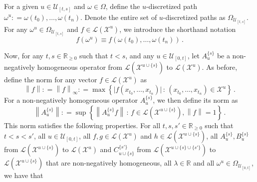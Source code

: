 \documentclass[a4paper,reqno]{amsart}
\newcommand{\reals}{\mathbb{R}}
\newcommand{\realsnonneg}{\reals_{\geq 0}}
\newcommand{\states}{\mathcal{X}}
\newcommand{\gambles}{\mathcal{L}}
\newcommand{\norm}[1]{\left\lVert #1 \right\rVert}
\newcommand{\coloneqq}{:\!=}
\begin{document}
For a given $u\in\mathcal{U}_{[t,s]}$ and $\omega\in\Omega$, define the $u$-discretized path $\omega^u\coloneqq \omega(t_0),\ldots,\omega(t_n)$. Denote the entire set of $u$-discretized paths as $\Omega_{\mathcal{U}_{[t,s]}}$. For any $\omega^u\in\Omega_{\mathcal{U}_{[t,s]}}$ and $f\in\gambles(\states^u)$, we introduce the shorthand notation
\begin{equation*}
f(\omega^u) \equiv f(\omega(t_0),\ldots,\omega(t_n))\,.
\end{equation*}

Now, for any $t,s\in\realsnonneg$ such that $t<s$, and any $u\in\mathcal{U}_{[0,t]}$, let $A_u^{\{s\}}$ be a non-negatively homogeneous operator from $\gambles(\states^{u\cup \{s\}})$ to $\gambles(\states^u)$.
As before, define the norm for any vector $f\in\gambles(\states^u)$ as
\begin{equation*}
\norm{f}\coloneqq\norm{f}_\infty\coloneqq\max\left\{\bigl\vert f(x_{t_0},\ldots,x_{t_n})\bigr\vert\,:\,(x_{t_0},\ldots,x_{t_n})\in\states^u\right\}\,.
\end{equation*}
For a non-negatively homogeneous operator $A_u^{\{s\}}$, we then define its norm as
\begin{equation*}
\norm{A_u^{\{s\}}} \coloneqq \sup\left\{ \norm{A_u^{\{s\}}f}\,:\,f\in\gambles(\states^{u\cup \{s\}}),\norm{f}=1 \right\}\,.
\end{equation*}
This norm satisfies the following properties. For all $t,s,s'\in\realsnonneg$ such that $t<s<s'$, all $u\in\mathcal{U}_{[0,t]}$, all $f,g\in\gambles(\states^u)$ and $h\in\gambles(\states^{u\cup\{s\}})$, all $A_u^{\{s\}},B_u^{\{s\}}$ from $\gambles(\states^{u\cup \{s\}})$ to $\gambles(\states^u)$ and $C_{u\cup \{s\}}^{\{s'\}}$ from $\gambles(\states^{u\cup \{s\}\cup \{s'\}})$ to $\gambles(\states^{u\cup \{s\}})$ that are non-negatively homogeneous, all $\lambda\in\mathbb{R}$ and all $\omega^u\in\Omega_{\mathcal{U}_{[0,t]}}$, we have that
\vspace{5pt}
\end{document}
